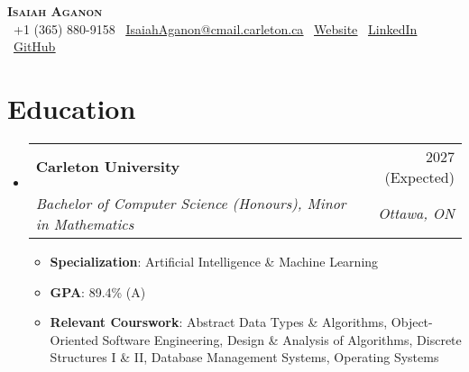 \documentclass[letterpaper,11pt]{article}
\makeatletter
\newcommand{\resumeItem}[1]{
  \item\small{
    {#1 \vspace{-2pt}}
  }
}
\newcommand{\resumeSubheading}[4]{
  \vspace{-2pt}\item
    \begin{tabular*}{0.97\textwidth}[t]{l@{\extracolsep{\fill}}r}
      \textbf{\large#1} & #2 \\
      \textit{\normalsize#3} & \textit{\normalsize #4} \\
    \end{tabular*}\vspace{-7pt}
}
\newcommand{\resumeSubHeadingListStart}{\begin{itemize}[leftmargin=0.15in, label={}]}
\newcommand{\resumeSubHeadingListEnd}{\end{itemize}}
\newcommand{\resumeItemListStart}{\begin{itemize}}
\newcommand{\resumeItemListEnd}{\end{itemize}\vspace{-5pt}}
\makeatother
\begin{document}

\begin{center}
  \textbf{\Huge \scshape Isaiah Aganon} \\ \vspace{1pt}
  \small
  \faPhone\ +1 (365) 880-9158  
  \hspace{5pt}
  \faEnvelope\ \href{mailto:IsaiahAganon@cmail.carleton.ca?subject=Re:%20Internship%20Application%20Status&body=Hello%20Isaiah,}{\uline{IsaiahAganon@cmail.carleton.ca}} 
  \hspace{5pt}
  \faGlobe\ \href{https://webpage-aganonisaiahs-projects.vercel.app/}{\uline{Website}}
  \hspace{5pt}
  \faLinkedin\ \href{https://www.linkedin.com/in/isaiah-aganon-888b892a8/}{\uline{LinkedIn}}
  \hspace{5pt}
  \faGithub\ \href{https://github.com/AganonIsaiah}{\uline{GitHub}}
\end{center}


\section{Education}
\resumeSubHeadingListStart
    \resumeSubheading
      {Carleton University}{2027 (Expected)}
      {Bachelor of Computer Science (Honours), Minor in Mathematics}{Ottawa, ON}
      \resumeItemListStart
        \resumeItem{{\bf Specialization}: Artificial Intelligence \& Machine Learning}
        \resumeItem{{\bf GPA}: 89.4\% (A)}
       \resumeItem{{\bf Relevant Courswork}: Abstract Data Types \& Algorithms, Object-Oriented Software Engineering, Design \& Analysis of Algorithms, Discrete Structures I \& II, Database Management Systems, Operating Systems}
      \resumeItemListEnd
\resumeSubHeadingListEnd
\end{document}
